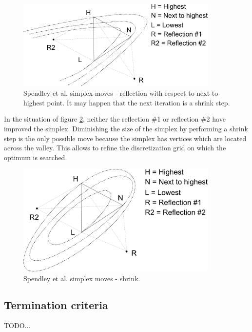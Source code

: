 \begin{figure}
\begin{center}
\includegraphics[width=10cm]{spendley-steps-reflect2.png}
\end{center}
\caption{Spendley et al. simplex moves - reflection with respect to next-to-highest point. 
It may happen that the next iteration is a shrink step.}
\label{fig-spendley-moves-reflect2}
\end{figure}

In the situation of figure \ref{fig-spendley-moves-shrink}, neither the 
reflection \#1 or reflection \#2 have improved the simplex. 
Diminishing the size of the simplex by performing a shrink step 
is the only possible move because the 
simplex has vertices which are located across the valley.
This allows to refine the discretization grid on which the 
optimum is searched.

\begin{figure}
\begin{center}
\includegraphics[width=10cm]{spendley-steps-shrink.png}
\end{center}
\caption{Spendley et al. simplex moves - shrink.}
\label{fig-spendley-moves-shrink}
\end{figure}

\subsection{Termination criteria}

TODO...

